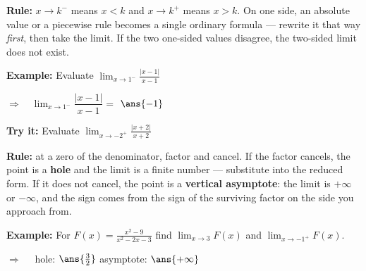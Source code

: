 \documentclass[12pt]{article}
\begin{document}


\begin{formulabox}
\textbf{Rule:} $x \to k^-$ means $x < k$ and $x \to k^+$ means $x > k$. On one
side, an absolute value or a piecewise rule becomes a single ordinary formula ---
rewrite it that way \emph{first}, then take the limit. If the two one-sided
values disagree, the two-sided limit does not exist.
\end{formulabox}

\begin{examplebox}
\textbf{Example:} \quad Evaluate $\displaystyle\lim_{x \to 1^-} \frac{|x-1|}{x-1}$

$\Rightarrow\quad \lim_{x \to 1^-} \dfrac{|x-1|}{x-1} = $ $\ans{-1}$
\end{examplebox}

\begin{tryitbox}
\textbf{Try it:} \quad Evaluate $\displaystyle\lim_{x \to -2^+} \frac{|x+2|}{x+2}$\\[2pt]
\end{tryitbox}


\begin{formulabox}
\textbf{Rule:} at a zero of the denominator, factor and cancel. If the factor
cancels, the point is a \textbf{hole} and the limit is a finite number ---
substitute into the reduced form. If it does not cancel, the point is a
\textbf{vertical asymptote}: the limit is $+\infty$ or $-\infty$, and the sign
comes from the sign of the surviving factor on the side you approach from.
\end{formulabox}

\begin{examplebox}
\textbf{Example:} \quad For $\displaystyle F(x) = \frac{x^2-9}{x^2-2x-3}$ find
$\displaystyle\lim_{x \to 3} F(x)$ and $\displaystyle\lim_{x \to -1^+} F(x)$.

$\Rightarrow\quad$ hole: $\ans{\tfrac{3}{2}}$ \quad asymptote: $\ans{+\infty}$
\end{examplebox}
\end{document}
